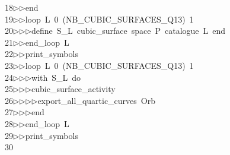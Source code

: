 \begin{tabbing}
18\>$\triangleright$\>$\triangleright$\>end\ \\[0pt]
19\>$\triangleright$\>$\triangleright$\>loop\ L\ 0\ (NB\_CUBIC\_SURFACES\_Q13)\ 1\ \\[0pt]
20\>$\triangleright$\>$\triangleright$\>$\triangleright$\>define\ S\_L\ cubic\_surface\ space\ P\ catalogue\ L\ end\ \\[0pt]
21\>$\triangleright$\>$\triangleright$\>end\_loop\ L\ \\[0pt]
22\>$\triangleright$\>$\triangleright$\>print\_symbols\ \\[0pt]
23\>$\triangleright$\>$\triangleright$\>loop\ L\ 0\ (NB\_CUBIC\_SURFACES\_Q13)\ 1\ \\[0pt]
24\>$\triangleright$\>$\triangleright$\>$\triangleright$\>with\ S\_L\ do\ \\[0pt]
25\>$\triangleright$\>$\triangleright$\>$\triangleright$\>cubic\_surface\_activity\ \\[0pt]
26\>$\triangleright$\>$\triangleright$\>$\triangleright$\>$\triangleright$\>export\_all\_quartic\_curves\ Orb\ \\[0pt]
27\>$\triangleright$\>$\triangleright$\>$\triangleright$\>end\ \\[0pt]
28\>$\triangleright$\>$\triangleright$\>end\_loop\ L\ \\[0pt]
29\>$\triangleright$\>$\triangleright$\>print\_symbols\\[0pt]
30\>\end{tabbing}
